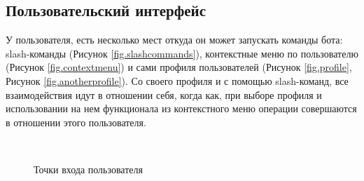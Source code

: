 \subsection{Пользовательский интерфейс}

У пользователя, есть несколько мест откуда он может запускать команды бота: slash-команды (Рисунок {\color{blue} \ref{fig.slashcommands}}), контекстные меню по пользователю (Рисунок {\color{blue} \ref{fig.contextmenu}}) и сами профиля пользователей (Рисунок {\color{blue} \ref{fig.profile}}, Рисунок {\color{blue} \ref{fig.anotherprofile}}). Со своего профиля и с помощью slash-команд, все взаимодействия идут в отношении себя, когда как, при выборе профиля и использовании на нем функционала из контекстного меню операции совершаются в отношении этого пользователя.


\begin{figure}
    \centering
    \\
    \caption{Точки входа пользователя}
\end{figure}


